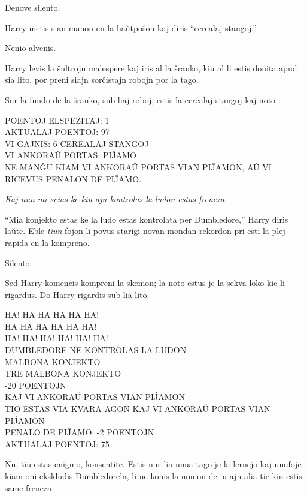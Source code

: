 Denove silento.

Harry metis sian manon en la haŭtpoŝon kaj diris ``cerealaj stangoj.''

Nenio alvenis.

Harry levis la ŝultrojn malespere kaj iris al la ŝranko, kiu al li estis donita
apud sia lito, por preni siajn sorĉistajn robojn por la tago.

Sur la fundo de la ŝranko, sub liaj roboj, estis la cerealaj stangoj
kaj noto :

\medskip
\begin{center}
  POENTOJ ELSPEZITAJ: 1\\
  AKTUALAJ POENTOJ: 97\\
  VI GAJNIS: 6 CEREALAJ STANGOJ\\
  VI ANKORAŬ PORTAS: PIĴAMO\\
  NE MANĜU KIAM VI ANKORAŬ PORTAS VIAN PIĴAMON, AŬ VI RICEVUS PENALON DE PIĴAMO.
\end{center}
\medskip

\emph{Kaj nun mi scias ke kiu ajn kontrolas la ludon estas freneza.}

``Mia konjekto estas ke la ludo estas kontrolata per Dumbledore,''
Harry diris laŭte. Eble \emph{tiun} fojon li povus starigi novan mondan
rekordon pri esti la plej rapida en la kompreno.

Silento.

Sed Harry komencis kompreni la skemon; la noto estus je la sekva loko
kie li rigardus. Do Harry rigardis sub lia lito.

\medskip
\begin{center}
  HA! HA HA HA HA HA!\\
  HA HA HA HA HA HA!\\
  HA! HA! HA! HA! HA! HA!\\
  DUMBLEDORE NE KONTROLAS LA LUDON\\
  MALBONA KONJEKTO\\
  TRE MALBONA KONJEKTO\\
  -20 POENTOJN\\
  KAJ VI ANKORAŬ PORTAS VIAN PIĴAMON\\
  TIO ESTAS VIA KVARA AGON KAJ VI ANKORAŬ PORTAS VIAN PIĴAMON\\
  PENALO DE PIĴAMO: -2 POENTOJN\\
  AKTUALAJ POENTOJ: 75
\end{center}

Nu, tiu estas enigmo, konsentite. Estis nur lia unua tago je la lernejo kaj
unufoje kiam oni ekskludis Dumbledore'n, li ne konis la nomon de iu ajn alia tie
kiu estis same freneza.

